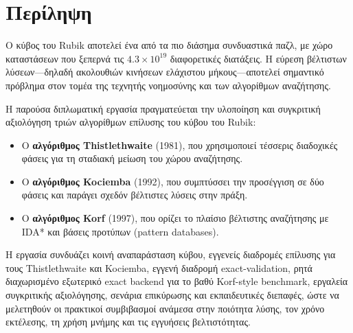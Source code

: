 
\chapter*{Περίληψη}

Ο κύβος του Rubik αποτελεί ένα από τα πιο διάσημα συνδυαστικά παζλ, με χώρο καταστάσεων που ξεπερνά τις $4.3 \times 10^{19}$ διαφορετικές διατάξεις. Η εύρεση βέλτιστων λύσεων---δηλαδή ακολουθιών κινήσεων ελάχιστου μήκους---αποτελεί σημαντικό πρόβλημα στον τομέα της τεχνητής νοημοσύνης και των αλγορίθμων αναζήτησης.

Η παρούσα διπλωματική εργασία πραγματεύεται την υλοποίηση και συγκριτική αξιολόγηση τριών αλγορίθμων επίλυσης του κύβου του Rubik:
\begin{itemize}
    \item Ο \textbf{αλγόριθμος Thistlethwaite} (1981), που χρησιμοποιεί τέσσερις διαδοχικές φάσεις για τη σταδιακή μείωση του χώρου αναζήτησης.
    \item Ο \textbf{αλγόριθμος Kociemba} (1992), που συμπτύσσει την προσέγγιση σε δύο φάσεις και παράγει σχεδόν βέλτιστες λύσεις στην πράξη.
    \item Ο \textbf{αλγόριθμος Korf} (1997), που ορίζει το πλαίσιο βέλτιστης αναζήτησης με IDA* και βάσεις προτύπων (pattern databases).
\end{itemize}

Η εργασία συνδυάζει κοινή αναπαράσταση κύβου, εγγενείς διαδρομές επίλυσης για
τους Thistlethwaite και Kociemba, εγγενή διαδρομή exact-validation, ρητά
διαχωρισμένο εξωτερικό exact backend για το βαθύ Korf-style benchmark, εργαλεία
συγκριτικής αξιολόγησης, σενάρια επικύρωσης και εκπαιδευτικές διεπαφές, ώστε να
μελετηθούν οι πρακτικοί συμβιβασμοί ανάμεσα στην ποιότητα λύσης, τον χρόνο
εκτέλεσης, τη χρήση μνήμης και τις εγγυήσεις βελτιστότητας.


